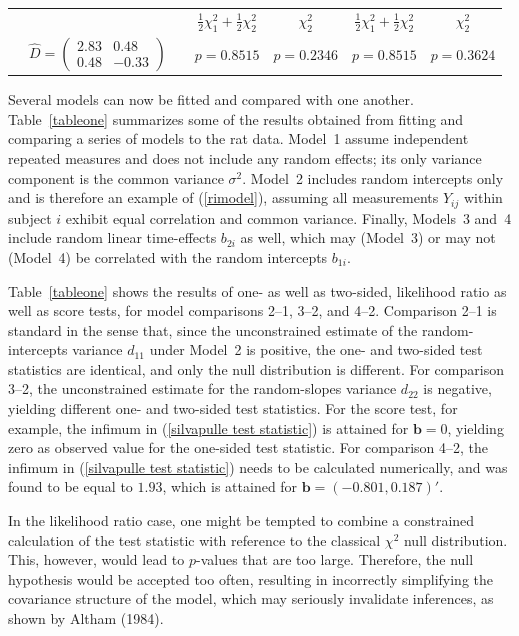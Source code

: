 \documentclass[useAMS,usenatbib,referee]{biom}
\newcommand{\boldb}{\bm{b}}
\begin{document}
\begin{table}
\begin{center}
\begin{tabular}{llccccc}
&  & & $\frac{1}{2} \chi^2_1 + \frac{1}{2} \chi^2_2$  &  $\chi^2_2$   & $\frac{1}{2} \chi^2_1 + \frac{1}{2} \chi^2_2$  &  $\chi^2_2$   \\  
 &$\widehat{D}=\left( \begin{array}{cc} 2.83  & 0.48 \\ 0.48 & -0.33 \end{array} \right)$  &  &  $p=0.8515$  & $p=0.2346$ &  $p=0.8515$ & $p=0.3624$ \\  
\hline
\end{tabular}
\end{center}
\end{table}

Several models can now be fitted and compared with one
another. Table~\ref{tableone} summarizes some of the results obtained
from fitting and comparing a series of models to the rat data. Model~1
assume independent repeated measures and does not include any random
effects; its only variance component is the common variance
$\sigma^2$. Model~2 includes random intercepts only and is therefore
an example of (\ref{rimodel}), assuming all measurements $Y_{ij}$
within subject $i$ exhibit equal correlation and common
variance. Finally, Models~3 and~4 include random linear time-effects
$b_{2i}$ as well, which may (Model~3) or may not (Model~4) be
correlated with the random intercepts $b_{1i}$.

Table~\ref{tableone} shows the results of one- as well as two-sided, likelihood
ratio as well as score tests, for model comparisons 2--1, 3--2, and
4--2. Comparison 2--1 is standard in the sense that, since the
unconstrained estimate of the random-intercepts variance $d_{11}$
under Model~2 is positive, the one- and two-sided test statistics are
identical, and only the null distribution is different. For comparison
3--2, the unconstrained estimate for the random-slopes variance
$d_{22}$ is negative, yielding different one- and two-sided test
statistics. For the score test, for example, the infimum in
(\ref{silvapulle test statistic}) is attained for $\boldb=0$, yielding
zero as observed value for the one-sided test statistic. For
comparison 4--2, the infimum in (\ref{silvapulle test statistic})
needs to be calculated numerically, and was found to be equal to
$1.93$, which is attained for $\boldb=(-0.801,0.187)'$.

In the likelihood ratio case, one might be tempted to combine a
constrained calculation of the test statistic with reference to the
classical $\chi^2$ null distribution.  This, however, would lead to
$p$-values that are too large. Therefore, the null hypothesis would be
accepted too often, resulting in incorrectly simplifying the
covariance structure of the model, which may seriously invalidate
inferences, as shown by Altham (1984).
\end{document}
